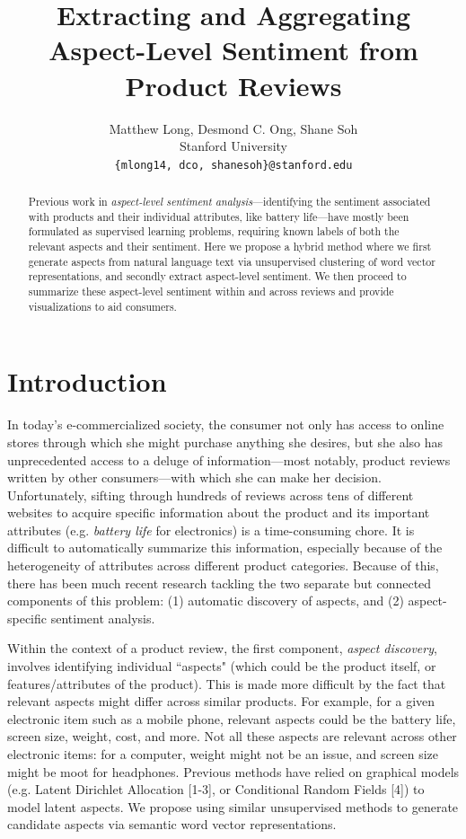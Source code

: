 \documentclass{article} %
\title{  Extracting and Aggregating Aspect-Level Sentiment from Product Reviews  }
\author{
Matthew Long, Desmond C. Ong, Shane Soh \\
Stanford University \\
\texttt{\{mlong14, dco, shanesoh\}@stanford.edu}
}
\begin{document}
\maketitle

\begin{abstract}
Previous work in \textit{aspect-level sentiment analysis}---identifying the sentiment associated with products and their individual attributes, like battery life---have mostly been formulated as supervised learning problems, requiring known labels of both the relevant aspects and their sentiment. Here we propose a hybrid method where we first generate aspects from natural language text via unsupervised clustering of word vector representations, and secondly extract aspect-level sentiment. We then proceed to summarize these aspect-level sentiment within and across reviews and provide visualizations to aid consumers.
\end{abstract}

\section{Introduction}

In today's e-commercialized society, the consumer not only has access to online stores through which she might purchase anything she desires, but she also has unprecedented access to a deluge of information---most notably, product reviews written by other consumers---with which she can make her decision. Unfortunately, sifting through hundreds of reviews across tens of different websites to acquire specific information about the product and its important attributes (e.g. \textit{battery life} for electronics) is a time-consuming chore. It is difficult to automatically summarize this information, especially because of the heterogeneity of attributes across different product categories. Because of this, there has been much recent research tackling the two separate but connected components of this problem: (1) automatic discovery of aspects, and (2) aspect-specific sentiment analysis.

Within the context of a product review, the first component, \textit{aspect discovery}, involves identifying individual ``aspects" (which could be the product itself, or features/attributes of the product). This is made more difficult by the fact that relevant aspects might differ across similar products. For example, for a given electronic item such as a mobile phone, relevant aspects could be the battery life, screen size, weight, cost, and more. Not all these aspects are relevant across other electronic items: for a computer, weight might not be an issue, and screen size might be moot for headphones. Previous methods have relied on graphical models (e.g. Latent Dirichlet Allocation [1-3], or Conditional Random Fields [4]) to model latent aspects. We propose using similar unsupervised methods to generate candidate aspects via semantic word vector representations. 
\end{document}
